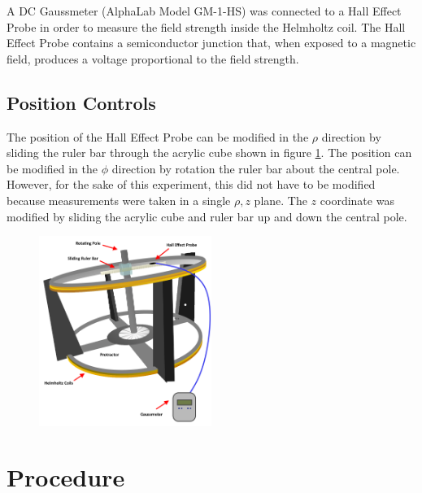 \documentclass[a4paper]{article}
\begin{document}
\begin{itemize}
A DC Gaussmeter (AlphaLab Model GM-1-HS) was connected to a Hall
Effect Probe in order to measure the field strength inside the
Helmholtz coil. The Hall Effect Probe contains a semiconductor
junction that, when exposed to a magnetic field, produces a voltage
proportional to the field strength.

\subsection{Position Controls}

The position of the Hall Effect Probe can be modified in the $\rho$
direction by sliding the ruler bar through the acrylic cube shown in
figure \ref{helmholtz_diagram}. The position can be modified in the
$\phi$ direction by rotation the ruler bar about the central
pole. However, for the sake of this experiment, this did not have to
be modified because measurements were taken in a single $\rho , z$
plane. The $z$ coordinate was modified by sliding the acrylic cube and
ruler bar up and down the central pole.

\begin{figure}[h]
\centering
\includegraphics[width=0.5\textwidth]{helmholtz_diagram.png}
\label{helmholtz_diagram}
\end{figure}

\section{Procedure}


\end{itemize}
\end{document}
